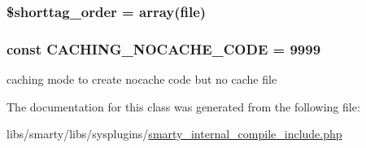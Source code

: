 \subsubsection[{\$shorttag\+\_\+order}]{\setlength{\rightskip}{0pt plus 5cm}\$shorttag\+\_\+order = array(\textquotesingle{}file\textquotesingle{})}\label{class_smarty___internal___compile___include_a2ccb25269c3a92e8c4796c7ef23725e6}
\hypertarget{class_smarty___internal___compile___include_ae23cc7a160b3b25f711de516d663ac54}{}
\subsubsection[{C\+A\+C\+H\+I\+N\+G\+\_\+\+N\+O\+C\+A\+C\+H\+E\+\_\+\+C\+O\+D\+E}]{\setlength{\rightskip}{0pt plus 5cm}const C\+A\+C\+H\+I\+N\+G\+\_\+\+N\+O\+C\+A\+C\+H\+E\+\_\+\+C\+O\+D\+E = 9999}\label{class_smarty___internal___compile___include_ae23cc7a160b3b25f711de516d663ac54}
caching mode to create nocache code but no cache file 

The documentation for this class was generated from the following file\+:\begin{DoxyCompactItemize}
\item 
libs/smarty/libs/sysplugins/\hyperlink{smarty__internal__compile__include_8php}{smarty\+\_\+internal\+\_\+compile\+\_\+include.\+php}\end{DoxyCompactItemize}
